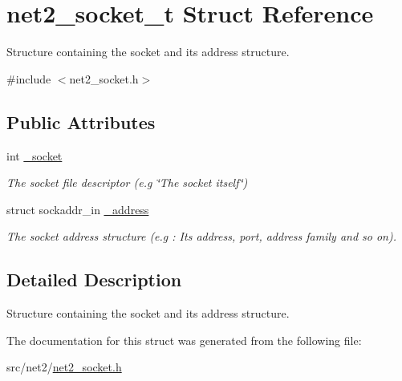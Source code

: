 \hypertarget{structnet2__socket__t}{}\section{net2\+\_\+socket\+\_\+t Struct Reference}
\label{structnet2__socket__t}


Structure containing the socket and its address structure.  




{\ttfamily \#include $<$net2\+\_\+socket.\+h$>$}

\subsection*{Public Attributes}
\begin{DoxyCompactItemize}
\item 
\hypertarget{structnet2__socket__t_a605421383ca1720f2f46dbc19b4fd101}{}int \hyperlink{structnet2__socket__t_a605421383ca1720f2f46dbc19b4fd101}{\+\_\+socket}\label{structnet2__socket__t_a605421383ca1720f2f46dbc19b4fd101}

\begin{DoxyCompactList}\small\item\em The socket file descriptor (e.\+g \char`\"{}\+The socket itself\char`\"{}) \end{DoxyCompactList}\item 
\hypertarget{structnet2__socket__t_a6527b2540e35955db1187ddee8b75877}{}struct sockaddr\+\_\+in \hyperlink{structnet2__socket__t_a6527b2540e35955db1187ddee8b75877}{\+\_\+address}\label{structnet2__socket__t_a6527b2540e35955db1187ddee8b75877}

\begin{DoxyCompactList}\small\item\em The socket address structure (e.\+g \+: Its address, port, address family and so on). \end{DoxyCompactList}\end{DoxyCompactItemize}


\subsection{Detailed Description}
Structure containing the socket and its address structure. 

The documentation for this struct was generated from the following file\+:\begin{DoxyCompactItemize}
\item 
src/net2/\hyperlink{net2__socket_8h}{net2\+\_\+socket.\+h}\end{DoxyCompactItemize}
